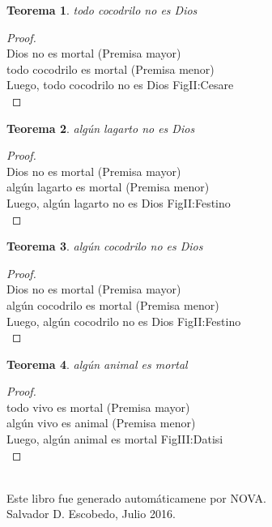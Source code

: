 ﻿\documentclass[12pt]{book}
\newtheorem{theorem}{Teorema}[chapter]
\newtheorem{proof}{Demostración}
\begin{document}
\begin{theorem}
todo cocodrilo no es Dios
\label{th: 107}
\end{theorem}\begin{proof}\\Dios no es mortal	 (Premisa mayor) \\todo cocodrilo es mortal	 (Premisa menor) \\Luego, todo cocodrilo no es Dios	FigII:Cesare \\ \end{proof}
\begin{theorem}
algún lagarto no es Dios
\label{th: 108}
\end{theorem}\begin{proof}\\Dios no es mortal	 (Premisa mayor) \\algún lagarto es mortal	 (Premisa menor) \\Luego, algún lagarto no es Dios	FigII:Festino \\ \end{proof}
\begin{theorem}
algún cocodrilo no es Dios
\label{th: 109}
\end{theorem}\begin{proof}\\Dios no es mortal	 (Premisa mayor) \\algún cocodrilo es mortal	 (Premisa menor) \\Luego, algún cocodrilo no es Dios	FigII:Festino \\ \end{proof}
\begin{theorem}
algún animal es mortal
\label{th: 110}
\end{theorem}\begin{proof}\\todo vivo es mortal	 (Premisa mayor) \\algún vivo es animal	 (Premisa menor) \\Luego, algún animal es mortal	FigIII:Datisi \\ \end{proof}
\\\small{Este libro fue generado automáticamene por NOVA.} \\
\small{Salvador D. Escobedo, Julio 2016}.
\end{document}
